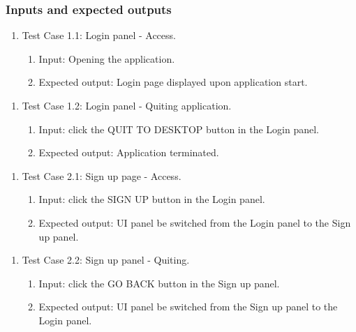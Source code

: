 \documentclass[11pt]{article}
\begin{document}
    \subsubsection*{Inputs and expected outputs}
    \begin{enumerate}
        \item Test Case 1.1: Login panel - Access.
        \begin{enumerate}
            \item  Input: Opening the application.
            \item  Expected output: Login page displayed upon application start.
        \end{enumerate}
    \end{enumerate}
    \begin{enumerate}
        \item Test Case 1.2: Login panel - Quiting application.
        \begin{enumerate}
            \item  Input: click the QUIT TO DESKTOP button in the Login panel.
            \item  Expected output: Application terminated.
        \end{enumerate}
    \end{enumerate}
    \begin{enumerate}
        \item Test Case 2.1: Sign up page - Access.
        \begin{enumerate}
            \item  Input: click the SIGN UP button in the Login panel.
            \item  Expected output: UI panel be switched from the Login panel to the Sign up panel.
        \end{enumerate}
    \end{enumerate}
    \begin{enumerate}
        \item Test Case 2.2: Sign up panel - Quiting.
        \begin{enumerate}
            \item  Input: click the GO BACK button in the Sign up panel.
            \item  Expected output: UI panel be switched from the Sign up panel to the Login panel.
        \end{enumerate}
    \end{enumerate}
    
\end{document}
